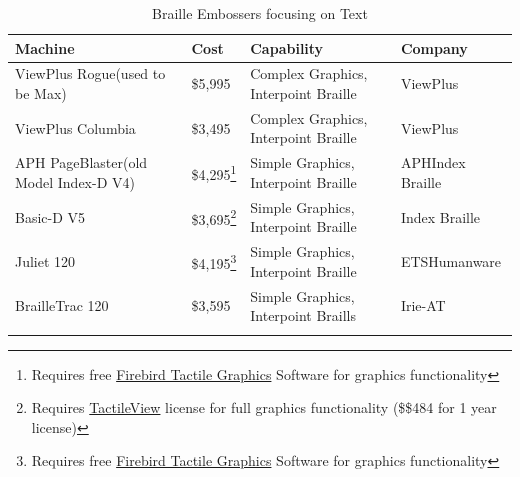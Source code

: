 \documentclass[14pt, letterpaper,twoside]{extreport}
\begin{document}
\begin{longtable}[]{@{}
	>{\raggedright\arraybackslash}p{}
	>{\raggedright\arraybackslash}p{}
	>{\raggedright\arraybackslash}p{}
	>{\raggedright\arraybackslash}p{}@{}
	}
	\toprule\noalign{}

	\textbf{Machine}                             & \textbf{Cost}                                                                                                                                                         & \textbf{Capability}                  & \textbf{Company}        \\
	\midrule\noalign{}
	\endhead
	\bottomrule\noalign{}
	\endlastfoot
	ViewPlus Rogue\break (used to be Max)        & \$5,995                                                                                                                                                               & Complex Graphics, Interpoint Braille & ViewPlus                \\[1.0em]
	ViewPlus Columbia                            & \$3,495                                                                                                                                                               & Complex Graphics, Interpoint Braille & ViewPlus                \\[1.0em]
	APH PageBlaster\break (old Model Index-D V4) & \$4,295\footnote{Requires free \href{https://www.aph.org/app/uploads/2020/07/Firebird_signed_V31.zip}{Firebird Tactile Graphics} Software for graphics functionality} & Simple Graphics, Interpoint Braille  & APH\break Index Braille \\[1.0em]
	Basic-D V5                                   & \$3,695\footnote{Requires \href{https://tactileview.com/}{TactileView} license for full graphics functionality (\$\$484 for 1 year license)}                          & Simple Graphics, Interpoint Braille  & Index Braille           \\[1.0em]
	Juliet 120                                   & \$4,195\footnote{Requires free \href{https://www.aph.org/app/uploads/2020/07/Firebird_signed_V31.zip}{Firebird Tactile Graphics} Software for graphics functionality} & Simple Graphics, Interpoint Braille  & ETS\break Humanware     \\[1.0em]
	BrailleTrac 120                              & \$3,595                                                                                                                                                               & Simple Graphics, Interpoint Braills  & Irie-AT                 \\[1.0em]\hline
	\caption{ Braille Embossers focusing on Text}
\end{longtable}
\end{document}
